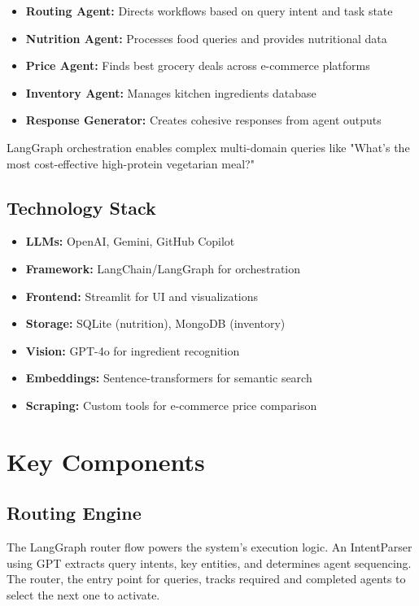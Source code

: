 \documentclass{ecai}
\begin{document}
\begin{itemize}[noitemsep,topsep=0pt]
    \item \textbf{Routing Agent:} Directs workflows based on query intent and task state
    \item \textbf{Nutrition Agent:} Processes food queries and provides nutritional data
    \item \textbf{Price Agent:} Finds best grocery deals across e-commerce platforms
    \item \textbf{Inventory Agent:} Manages kitchen ingredients database
    \item \textbf{Response Generator:} Creates cohesive responses from agent outputs
\end{itemize}

LangGraph orchestration enables complex multi-domain queries like "What's the most cost-effective high-protein vegetarian meal?"

\subsection{Technology Stack}

\begin{itemize}[noitemsep,topsep=0pt]
    \item \textbf{LLMs:} OpenAI, Gemini, GitHub Copilot
    \item \textbf{Framework:} LangChain/LangGraph for orchestration
    \item \textbf{Frontend:} Streamlit for UI and visualizations
    \item \textbf{Storage:} SQLite (nutrition), MongoDB (inventory)
    \item \textbf{Vision:} GPT-4o for ingredient recognition
    \item \textbf{Embeddings:} Sentence-transformers for semantic search
    \item \textbf{Scraping:} Custom tools for e-commerce price comparison
\end{itemize}

\section{Key Components}

\subsection{Routing Engine}

The LangGraph router flow powers the system's execution logic. An IntentParser using GPT extracts query intents, key entities, and determines agent sequencing. The router, the entry point for queries, tracks required and completed agents to select the next one to activate.
\end{document}
